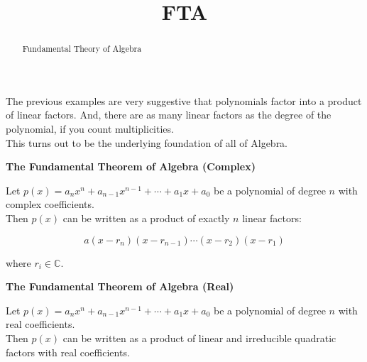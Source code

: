 \documentclass{ximera}
\title{FTA}
\begin{document}
\begin{abstract}
Fundamental Theory of Algebra
\end{abstract}
\maketitle









The previous examples are very suggestive that polynomials factor into a product of linear factors.  And, there are as many linear factors as the degree of the polynomial, if you count multiplicities. \\



This turns out to be the underlying foundation of all of Algebra. \\




\begin{theorem} \textbf{\textcolor{green!50!black}{The Fundamental Theorem of Algebra (Complex)}} 



Let $p(x) = a_n x^n + a_{n-1} x^{n-1} + \cdots + a_1 x + a_0$ be a polynomial of degree $n$ with complex coefficients. \\


Then $p(x)$ can be written as a product of exactly $n$ linear factors:

\[
 a (x - r_n) (x - r_{n-1}) \cdots (x - r_2)  (x - r_1) 
\]


where $r_i \in \mathbb{C}$.


\end{theorem}








\begin{theorem} \textbf{\textcolor{green!50!black}{The Fundamental Theorem of Algebra (Real)}} 



Let $p(x) = a_n x^n + a_{n-1} x^{n-1} + \cdots + a_1 x + a_0$ be a polynomial of degree $n$ with real coefficients. \\


Then $p(x)$ can be written as a product of linear and irreducible quadratic factors with real coefficients.


\end{theorem}
\end{document}
